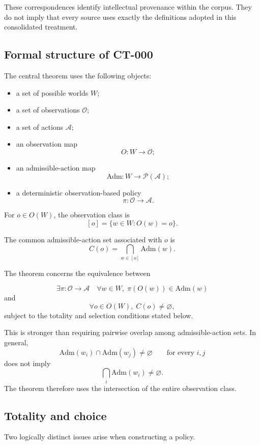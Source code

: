 \documentclass[11pt]{article}
\theoremstyle{definition}
\theoremstyle{remark}
\newcommand{\worlds}{W}
\newcommand{\acts}{\mathcal{A}}
\newcommand{\obs}{\mathcal{O}}
\newcommand{\admissible}{\mathrm{Adm}}
\begin{document}
These correspondences identify intellectual provenance within the corpus.
They do not imply that every source uses exactly the definitions adopted in
this consolidated treatment.

\subsection{Formal structure of CT-000}

The central theorem uses the following objects:

\begin{itemize}
  \item a set of possible worlds $\worlds$;
  \item a set of observations $\obs$;
  \item a set of actions $\acts$;
  \item an observation map
    \[
      O:\worlds\to\obs;
    \]
  \item an admissible-action map
    \[
      \admissible:\worlds\to\mathcal{P}(\acts);
    \]
  \item a deterministic observation-based policy
    \[
      \pi:\obs\to\acts.
    \]
\end{itemize}

For $o\in O(\worlds)$, the observation class is
\[
  [o]=\{w\in\worlds:O(w)=o\}.
\]

The common admissible-action set associated with $o$ is
\[
  C(o)
  =
  \bigcap_{w\in[o]}\admissible(w).
\]

The theorem concerns the equivalence between

\[
  \exists\pi:\obs\to\acts
  \quad
  \forall w\in\worlds,\;
  \pi(O(w))\in\admissible(w)
\]
and
\[
  \forall o\in O(\worlds),\;
  C(o)\neq\varnothing,
\]
subject to the totality and selection conditions stated below.

This is stronger than requiring pairwise overlap among admissible-action
sets. In general,
\[
  \admissible(w_i)\cap\admissible(w_j)\neq\varnothing
  \qquad\text{for every }i,j
\]
does not imply
\[
  \bigcap_i\admissible(w_i)\neq\varnothing.
\]
The theorem therefore uses the intersection of the entire observation class.

\subsection{Totality and choice}

Two logically distinct issues arise when constructing a policy.
\end{document}
